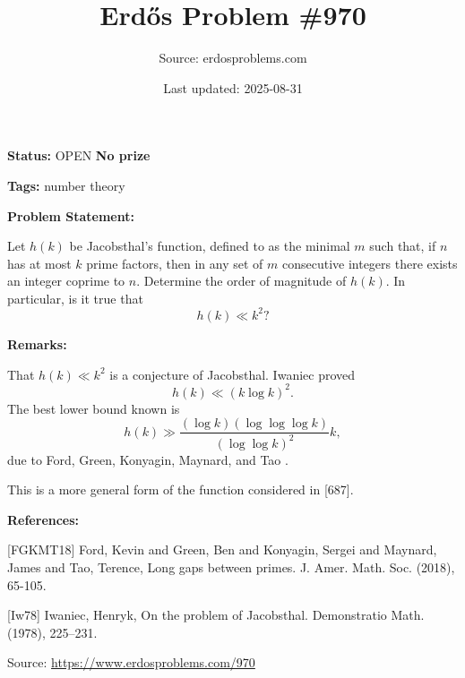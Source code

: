 \documentclass{article}
\title{Erd\H{o}s Problem \#970}
\date{Last updated: 2025-08-31}
\author{Source: erdosproblems.com}
\begin{document}
\maketitle

\noindent\textbf{Status:} OPEN \quad \textbf{No prize}

\noindent\textbf{Tags:} number theory

\medskip
\noindent\textbf{Problem Statement:}

Let $h(k)$ be Jacobsthal's function, defined to as the minimal $m$ such that, if $n$ has at most $k$ prime factors, then in any set of $m$ consecutive integers there exists an integer coprime to $n$. Determine the order of magnitude of $h(k)$. In particular, is it true that\[h(k) \ll k^2?\]

\bigskip
\noindent\textbf{Remarks:}

That $h(k)\ll k^2$ is a conjecture of Jacobsthal. Iwaniec \cite{Iw78} proved\[h(k) \ll (k\log k)^2.\]The best lower bound known is\[h(k) \gg \frac{(\log k)(\log\log\log k)}{(\log\log k)^2}k,\]due to Ford, Green, Konyagin, Maynard, and Tao \cite{FGKMT18}.

This is a more general form of the function considered in [687].

\bigskip
\noindent\textbf{References:}

[FGKMT18] Ford, Kevin and Green, Ben and Konyagin, Sergei and Maynard, James and Tao, Terence, Long gaps between primes. J. Amer. Math. Soc. (2018), 65-105.
 
 [Iw78] Iwaniec, Henryk, On the problem of {J}acobsthal. Demonstratio Math. (1978), 225--231.

\bigskip
\noindent\small{Source: \url{https://www.erdosproblems.com/970}}
\end{document}
